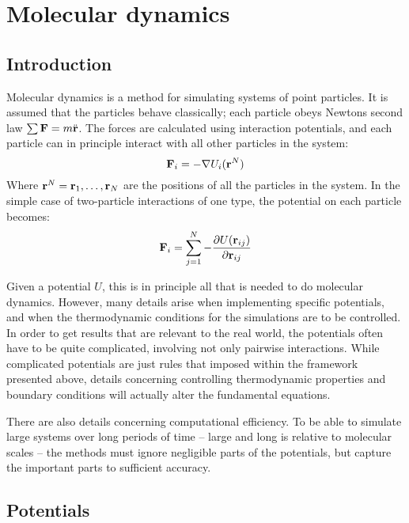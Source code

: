 \chapter{Molecular dynamics}

\section{Introduction}
Molecular dynamics is a method for simulating systems of point particles. It is assumed that the particles behave classically; each particle obeys Newtons second law $\sum \mathbf{F} = m\ddot{\mathbf{r}}$. The forces are calculated using interaction potentials, and each particle can in principle interact with all other particles in the system:
\begin{equation}
	\mathbf{F}_i = -\nabla U_i(\mathbf{r}^N)
\end{equation}
Where $\mathbf{r}^N = \mathbf{r}_1, \dots, \mathbf{r}_N$ are the positions of all the particles in the system. In the simple case of two-particle interactions of one type, the potential on each particle becomes:
\begin{equation}
	\mathbf{F}_i = \sum_{j=1}^N -\frac{\partial U(\mathbf{r}_{ij})}{\partial \mathbf{r}_{ij}}
\end{equation}

Given a potential $U$, this is in principle all that is needed to do molecular dynamics. However, many details arise when implementing specific potentials, and when the thermodynamic conditions for the simulations are to be controlled. In order to get results that are relevant to the real world, the potentials often have to be quite complicated, involving not only pairwise interactions. While complicated potentials are just rules that imposed within the framework presented above, details concerning controlling thermodynamic properties and boundary conditions will actually alter the fundamental equations. 

There are also details concerning computational efficiency. To be able to simulate large systems over long periods of time -- large and long is relative to molecular scales -- the methods must ignore negligible parts of the potentials, but capture the important parts to sufficient accuracy.

\section{Potentials}


